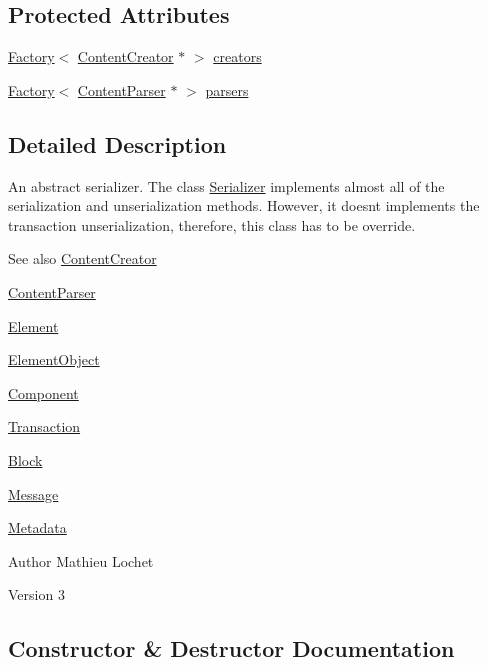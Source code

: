 \subsection*{Protected Attributes}
\begin{DoxyCompactItemize}
\item 
\mbox{\hyperlink{classFactory}{Factory}}$<$ \mbox{\hyperlink{classContentCreator}{Content\+Creator}} $\ast$ $>$ \mbox{\hyperlink{classSerializer_a7d26e865966b304350653b1246ec3340}{creators}}
\item 
\mbox{\hyperlink{classFactory}{Factory}}$<$ \mbox{\hyperlink{classContentParser}{Content\+Parser}} $\ast$ $>$ \mbox{\hyperlink{classSerializer_a96f96c01e6a471513669621751591fd9}{parsers}}
\end{DoxyCompactItemize}


\subsection{Detailed Description}
An abstract serializer. The class \mbox{\hyperlink{classSerializer}{Serializer}} implements almost all of the serialization and unserialization methods. However, it doesn\textquotesingle{}t implements the transaction unserialization, therefore, this class has to be override. \begin{DoxySeeAlso}{See also}
\mbox{\hyperlink{classContentCreator}{Content\+Creator}} 

\mbox{\hyperlink{classContentParser}{Content\+Parser}} 

\mbox{\hyperlink{classElement}{Element}} 

\mbox{\hyperlink{classElementObject}{Element\+Object}} 

\mbox{\hyperlink{classComponent}{Component}} 

\mbox{\hyperlink{classTransaction}{Transaction}} 

\mbox{\hyperlink{classBlock}{Block}} 

\mbox{\hyperlink{classMessage}{Message}} 

\mbox{\hyperlink{classMetadata}{Metadata}}
\end{DoxySeeAlso}
\begin{DoxyAuthor}{Author}
Mathieu Lochet 
\end{DoxyAuthor}
\begin{DoxyVersion}{Version}
3 
\end{DoxyVersion}


\subsection{Constructor \& Destructor Documentation}
\mbox{\label{classSerializer_a9fe7f31924098f75278d059f8443fd5b}} 
